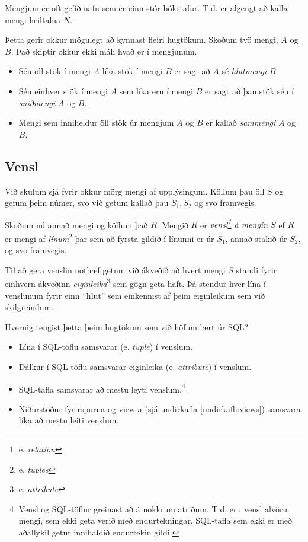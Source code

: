 Mengjum er oft gefið nafn sem er einn stór bókstafur. T.d. er algengt að kalla mengi heiltalna $N$. 

Þetta gerir okkur mögulegt að kynnast fleiri hugtökum. Skoðum tvö mengi, $A$ og $B$. Það skiptir okkur ekki máli hvað er í mengjunum.
\begin{itemize}
 \item Séu öll stök í mengi $A$ líka stök í mengi $B$ er sagt að $A$ sé \emph{hlutmengi} $B$.
 \item Séu einhver stök í mengi $A$ sem líka eru í mengi $B$ er sagt að þau stök séu í \emph{sniðmengi} $A$ og $B$.
 \item Mengi sem inniheldur öll stök úr mengjum $A$ og $B$ er kallað \emph{sammengi} $A$ og $B$.
\end{itemize}


\subsection{Vensl}
Við skulum sjá fyrir okkur mörg mengi af upplýsingum. Köllum þau öll $S$ og gefum þeim númer, svo við getum kallað þau $S_1, S_2$ og svo framvegis.

Skoðum nú annað mengi og köllum það $R$. Mengið $R$ er \emph{vensl\footnote{e. \emph{relation}} á mengin $S$} ef $R$ er mengi af \emph{línum}\footnote{e. \emph{tuples}} þar sem að fyrsta gildið í línunni er úr $S_1$, annað stakið úr $S_2$, og svo framvegis.

Til að gera venslin nothæf getum við ákveðið að hvert mengi $S$ standi fyrir einhvern ákveðinn \emph{eiginleika}\footnote{e. \emph{attribute}} sem gögn geta haft. Þá stendur hver lína í venslunum fyrir einn ``hlut'' sem einkennist af þeim eiginleikum sem við skilgreindum.

Hvernig tengist þetta þeim hugtökum sem við höfum lært úr SQL?

\begin{itemize}
 \item Lína í SQL-töflu samsvarar (e. \emph{tuple}) í venslum.
 \item Dálkur í SQL-töflu samsvarar eiginleika (e. \emph{attribute}) í venslum.
 \item SQL-tafla samsvarar að mestu leyti venslum.\footnote{Vensl og SQL-töflur greinast að á nokkrum atriðum. T.d. eru vensl alvöru mengi, sem ekki geta verið með endurtekningar. SQL-tafla sem ekki er með aðallykil getur innihaldið endurtekin gildi.}
 \item Niðurstöður fyrirspurna og view-a (sjá undirkafla \ref{undirkafli:views}) samsvara líka að mestu leiti venslum.
\end{itemize}

